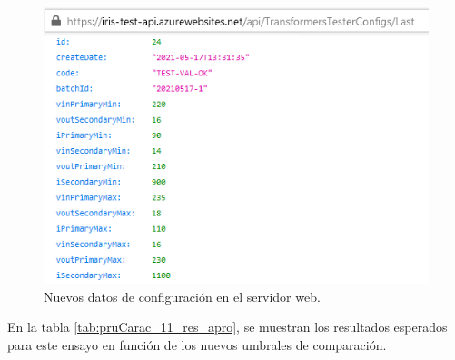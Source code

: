\begin{figure}[htpb]
	\centering
	\includegraphics[scale=0.9]{./Figures/serv_web_ok_conf.png}
	\caption{Nuevos datos de configuración en el servidor web.}
	\label{fig:serv_web_ok_conf}
\end{figure}

En la tabla \ref{tab:pruCarac_11_res_apro}, se muestran los resultados esperados para este ensayo en función de los nuevos umbrales de comparación.

\begin{table}[htpb]
\centering
\caption[Ensayo para transformador aprobado]{Resultados esperados para el \textit{test path} 11 en la condición de transformador aprobado}
\label{tab:pruCarac_11_res_apro}
\end{table}


